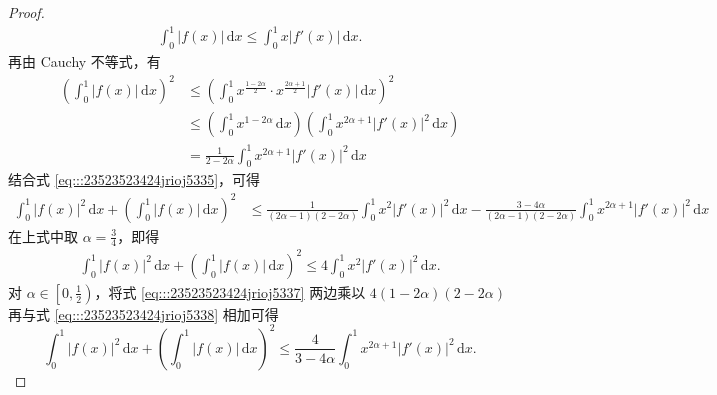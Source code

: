 \documentclass[../../main.tex]{subfiles}
\begin{document}
\begin{proof}
\begin{align}
\int_{0}^{1} |f(x)| \, \mathrm{d}x \leqslant \int_{0}^{1} x |f'(x)| \, \mathrm{d}x. \label{eq:::23523523424jrioj5336}
\end{align}
再由 Cauchy 不等式，有
\begin{align*}
\left( \int_{0}^{1} |f(x)| \, \mathrm{d}x \right)^2 &\leqslant \left( \int_{0}^{1} x^{\frac{1 - 2\alpha}{2}} \cdot x^{\frac{2\alpha + 1}{2}} |f'(x)| \, \mathrm{d}x \right)^2 \\
&\leqslant \left( \int_{0}^{1} x^{1 - 2\alpha} \, \mathrm{d}x \right) \left( \int_{0}^{1} x^{2\alpha + 1} |f'(x)|^2 \, \mathrm{d}x \right)
\\
&= \frac{1}{2 - 2\alpha} \int_{0}^{1} x^{2\alpha + 1} |f'(x)|^2 \, \mathrm{d}x
\end{align*}
结合式 \eqref{eq:::23523523424jrioj5335}，可得
\begin{align}
\int_{0}^{1} |f(x)|^2 \, \mathrm{d}x + \left( \int_{0}^{1} |f(x)| \, \mathrm{d}x \right)^2 &\leqslant \frac{1}{(2\alpha - 1)(2 - 2\alpha)} \int_{0}^{1} x^2 |f'(x)|^2 \, \mathrm{d}x - \frac{3 - 4\alpha}{(2\alpha - 1)(2 - 2\alpha)} \int_{0}^{1} x^{2\alpha + 1} |f'(x)|^2 \, \mathrm{d}x \label{eq:::23523523424jrioj5337}
\end{align}
在上式中取 \( \alpha = \frac{3}{4} \)，即得
\begin{align}
\int_{0}^{1} |f(x)|^2 \, \mathrm{d}x + \left( \int_{0}^{1} |f(x)| \, \mathrm{d}x \right)^2 \leqslant 4 \int_{0}^{1} x^2 |f'(x)|^2 \, \mathrm{d}x .\label{eq:::23523523424jrioj5338}
\end{align}
对 \( \alpha \in \left[0, \frac{1}{2}\right) \)，将式 \eqref{eq:::23523523424jrioj5337} 两边乘以 \( 4(1 - 2\alpha)(2 - 2\alpha) \) 再与式 \eqref{eq:::23523523424jrioj5338} 相加可得
\[
\int_{0}^{1} |f(x)|^2 \, \mathrm{d}x + \left( \int_{0}^{1} |f(x)| \, \mathrm{d}x \right)^2 \leqslant \frac{4}{3 - 4\alpha} \int_{0}^{1} x^{2\alpha + 1} |f'(x)|^2 \, \mathrm{d}x.
\]

\end{proof}
\end{document}
